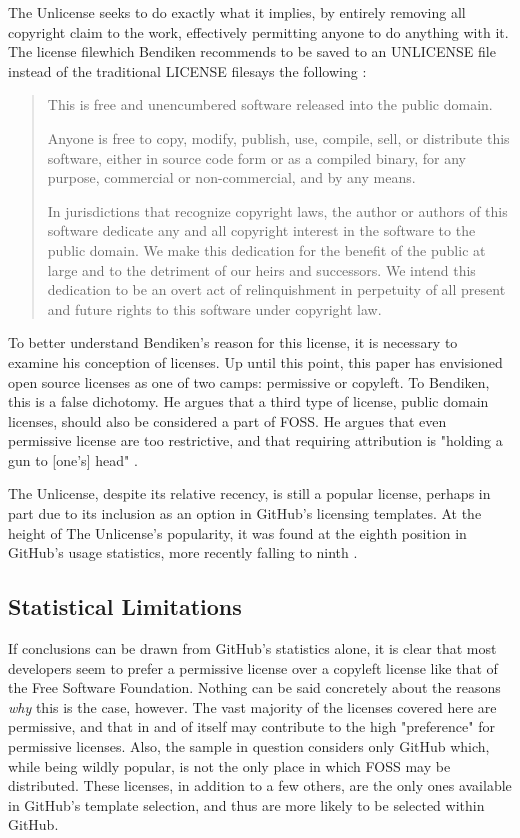 \documentclass[manuscript,screen,nonacm,12pt]{acmart}
\begin{document}
The Unlicense seeks to do exactly what it implies, by entirely removing all
copyright claim to the work, effectively permitting anyone to do anything with
it. The license file\textemdash which Bendiken recommends to be saved to an
UNLICENSE file instead of the traditional LICENSE file\textemdash says the
following \cite{unlicense}:

\begin{quotation}
    This is free and unencumbered software released into the public domain.

    Anyone is free to copy, modify, publish, use, compile, sell, or
    distribute this software, either in source code form or as a compiled
    binary, for any purpose, commercial or non-commercial, and by any
    means.
    
    In jurisdictions that recognize copyright laws, the author or authors
    of this software dedicate any and all copyright interest in the
    software to the public domain. We make this dedication for the benefit
    of the public at large and to the detriment of our heirs and
    successors. We intend this dedication to be an overt act of
    relinquishment in perpetuity of all present and future rights to this
    software under copyright law. 
\end{quotation}

To better understand Bendiken's reason for this license, it is necessary to
examine his conception of licenses. Up until this point, this paper has
envisioned open source licenses as one of two camps: permissive or copyleft. To
Bendiken, this is a false dichotomy. He argues that a third type of license,
public domain licenses, should also be considered a part of FOSS. He argues that
even permissive license are too restrictive, and that requiring attribution is
"holding a gun to [one's] head" \cite{bendiken_2025}.

The Unlicense, despite its relative recency, is still a popular license, perhaps
in part due to its inclusion as an option in GitHub's licensing templates. At
the height of The Unlicense's popularity, it was found at the eighth position in
GitHub's usage statistics, more recently falling to ninth \cite{githubUsage}.

\subsection{Statistical Limitations}
If conclusions can be drawn from GitHub's statistics alone, it is clear that
most developers seem to prefer a permissive license over a copyleft license like
that of the Free Software Foundation. Nothing can be said concretely about the
reasons \textit{why} this is the case, however. The vast majority of the
licenses covered here are permissive, and that in and of itself may contribute
to the high "preference" for permissive licenses. Also, the sample in question
considers only GitHub which, while being wildly popular, is not the only
place in which FOSS may be distributed. These licenses, in addition to a few
others, are the only ones available in GitHub's template selection, and thus are
more likely to be selected within GitHub.
\end{document}
